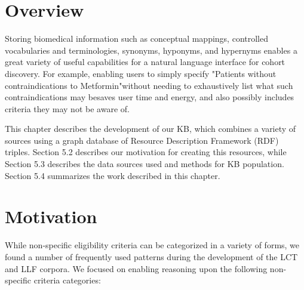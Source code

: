 \documentclass[../main.tex]{subfiles}
\begin{document}


\section{Overview}

Storing biomedical information such as conceptual mappings, controlled vocabularies and terminologies, synonyms, hyponyms, and hypernyms enables a great variety of useful capabilities for a natural language interface for cohort discovery. For example, enabling users to simply specify "Patients without contraindications to Metformin"\textemdash without needing to exhaustively list what such contraindications may be\textemdash saves user time and energy, and also possibly includes criteria they may not be aware of.  

This chapter describes the development of our KB, which combines a variety of sources using a graph database of Resource Description Framework (RDF) \cite{manola2004rdf} triples. Section 5.2 describes our motivation for creating this resources, while Section 5.3 describes the data sources used and methods for KB population. Section 5.4 summarizes the work described in this chapter.

\section{Motivation}

While non-specific eligibility criteria can be categorized in a variety of forms, we found a number of frequently used patterns during the development of the LCT and LLF corpora. We focused on enabling reasoning upon the following non-specific criteria categories:
\end{document}
